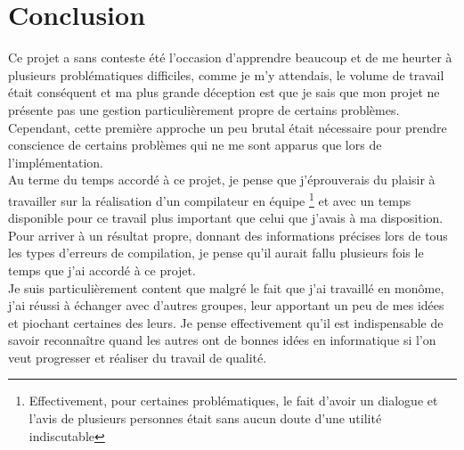 \documentclass[12pt]{article}
\begin{document}
\section{Conclusion}
Ce projet a sans conteste été l'occasion d'apprendre beaucoup et de me
heurter à plusieurs problématiques difficiles, comme je m'y attendais, le
volume de travail était conséquent et ma plus grande déception est que je
sais que mon projet ne présente pas une gestion particulièrement propre de
certains problèmes. Cependant, cette première approche un peu brutal était
nécessaire pour prendre conscience de certains problèmes qui ne me sont
apparus que lors de l'implémentation.\\

Au terme du temps accordé à ce projet, je pense que j'éprouverais du plaisir
à travailler sur la réalisation d'un compilateur en équipe
\footnote{Effectivement, pour certaines problématiques, le fait d'avoir un
dialogue et l'avis de plusieurs personnes était sans aucun doute d'une
utilité indiscutable} et avec un temps disponible pour ce travail plus
important que celui que j'avais à ma disposition. Pour arriver à un résultat
propre, donnant des informations précises lors de tous les types d'erreurs
de compilation, je pense qu'il aurait fallu plusieurs fois le temps que j'ai
accordé à ce projet.\\

Je suis particulièrement content que malgré le fait que j'ai travaillé en
monôme, j'ai réussi à échanger avec d'autres groupes, leur apportant un peu
de mes idées et piochant certaines des leurs. Je pense effectivement qu'il
est indispensable de savoir reconnaître quand les autres ont de bonnes idées
en informatique si l'on veut progresser et réaliser du travail de qualité.
\end{document}
